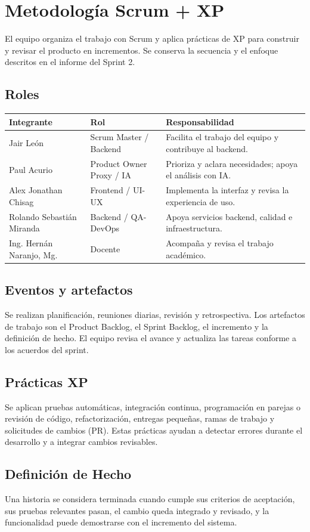 \section{Metodología Scrum + XP}
El equipo organiza el trabajo con Scrum y aplica prácticas de XP para construir y revisar el producto en incrementos. Se conserva la secuencia y el enfoque descritos en el informe del Sprint 2.

\subsection{Roles}
\begin{tabularx}{\textwidth}{|p{}|p{}|X|}\hline
\rowcolor{grisTarjeta}\textbf{Integrante} & \textbf{Rol} & \textbf{Responsabilidad}\\\hline
Jair León & Scrum Master / Backend & Facilita el trabajo del equipo y contribuye al backend.\\\hline
Paul Acurio & Product Owner Proxy / IA & Prioriza y aclara necesidades; apoya el análisis con IA.\\\hline
Alex Jonathan Chisag & Frontend / UI-UX & Implementa la interfaz y revisa la experiencia de uso.\\\hline
Rolando Sebastián Miranda & Backend / QA-DevOps & Apoya servicios backend, calidad e infraestructura.\\\hline
Ing. Hernán Naranjo, Mg. & Docente & Acompaña y revisa el trabajo académico.\\\hline
\end{tabularx}

\subsection{Eventos y artefactos}
Se realizan planificación, reuniones diarias, revisión y retrospectiva. Los artefactos de trabajo son el Product Backlog, el Sprint Backlog, el incremento y la definición de hecho. El equipo revisa el avance y actualiza las tareas conforme a los acuerdos del sprint.

\subsection{Prácticas XP}
Se aplican pruebas automáticas, integración continua, programación en parejas o revisión de código, refactorización, entregas pequeñas, ramas de trabajo y solicitudes de cambios (PR). Estas prácticas ayudan a detectar errores durante el desarrollo y a integrar cambios revisables.

\subsection{Definición de Hecho}
Una historia se considera terminada cuando cumple sus criterios de aceptación, sus pruebas relevantes pasan, el cambio queda integrado y revisado, y la funcionalidad puede demostrarse con el incremento del sistema.
